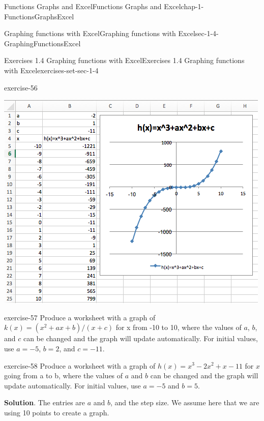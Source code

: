 \documentclass[oneside,10pt,]{book}
\numberwithin{equation}{section}
\begin{document}
\begin{chapterptx}{Functions Graphs and Excel}{}{Functions Graphs and Excel}{}{}{chap-1-FunctionsGraphsExcel}
\begin{sectionptx}{Graphing functions with Excel}{}{Graphing functions with Excel}{}{}{sec-1-4-GraphingFunctionsExcel}
\begin{exercises-subsection-numberless}{Exercises 1.4 Graphing functions with Excel}{}{Exercises 1.4 Graphing functions with Excel}{}{}{exercises-set-sec-1-4}
\begin{divisionexercise}{3}{}{}{exercise-56}
\begin{sidebyside}{1}{0}{0}{0}
\begin{sbspanel}{1}
\includegraphics[width=1\linewidth]{images/sec1-4-sol3a.png}
\end{sbspanel}%
\end{sidebyside}%
\end{divisionexercise}%
\begin{divisionexercise}{4}{}{}{exercise-57}%
\hypertarget{p-347}{}%
Produce a worksheet with a graph of \(k(x) = (x^2 + a x + b)/( x + c)\) for x from -10 to 10, where the values of \(a\), \(b\), and \(c\) can be changed and the graph will update automatically.  For initial values, use \(a = -5\), \(b = 2\), and \(c = -11\).%
\end{divisionexercise}%
\begin{divisionexercise}{5}{}{}{exercise-58}%
\hypertarget{p-348}{}%
Produce a worksheet with a graph of \(h(x) = x^3 -2 x^2 +  x -11\) for \(x\) going from a to b, where the values of \(a\) and \(b\) can be changed and the graph will update automatically.  For initial values, use \(a = -5\) and \(b = 5\).%
\par\smallskip%
\noindent\textbf{Solution}.\hypertarget{solution-29}{}\quad%
\hypertarget{p-349}{}%
The entries are \(a\) and \(b\), and the step size. We assume here that we are using 10 points to create a graph.%
\begin{sidebyside}{1}{0}{0}{0}%
\begin{sbspanel}{1}%

\end{sbspanel}
\end{sidebyside}
\end{divisionexercise}
\end{exercises-subsection-numberless}
\end{sectionptx}
\end{chapterptx}
\end{document}
